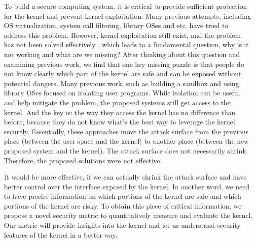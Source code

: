 To build a secure computing system, it is critical to provide sufficient protection for the kernel and 
prevent kernel exploitation. Many previous attempts, including OS virtualization, 
system call filtering, library OSes and etc. have tried to address this problem. However, 
kernel exploitation still exist, and the problem has not been solved 
effectively 
, which leads to a 
fundamental question, why is it not working and what are we missing? 
After thinking about this
question and examining previous work, we find that one key missing puzzle is that people do not know 
clearly which part of the kernel are safe and can be exposed without potential dangers. 
Many previous
work, such as building a sandbox and using library OSes focused on isolating user programs. While isolation 
can be useful and help mitigate the problem, the proposed systems still get access to the kernel. 
And the key is: the way they access the kernel has no difference than before, because they do not 
know what's the best way to leverage the kernel securely. Essentially, these approaches move
the attack surface from the previous place (between the user space and the kernel) to another place 
(between the new proposed system and the kernel). The attack surface
does not necessarily shrink.   
Therefore, the proposed solutions were not effective. 

It would be more effective, if we can actually shrink the attack surface and have better control over 
the interface exposed by the kernel. In another word, we need to have precise information on which portions of 
the kernel are safe and which portions of the kernel are risky.
To obtain this piece of critical information, we
propose a novel security metric to quantitatively measure and evaluate the kernel. Our metric will provide
insights into the kernel and let us understand security features of the kernel in a better way. 

